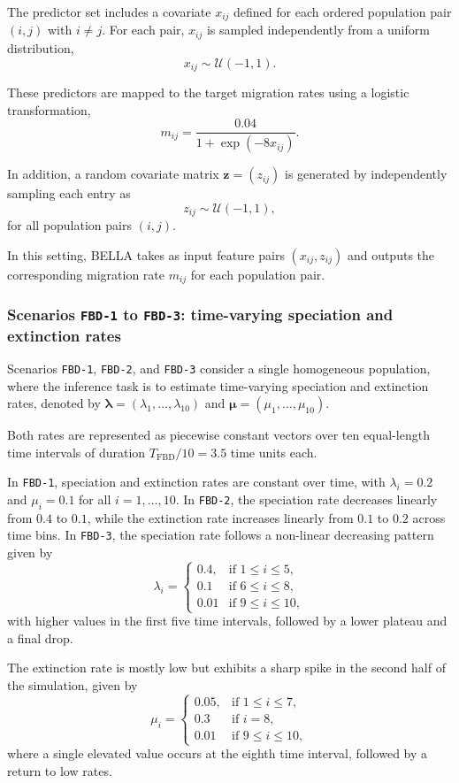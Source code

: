 The predictor set includes a covariate $x_{ij}$ defined for each ordered population pair $(i,j)$ with $i \neq j$. For each pair, $x_{ij}$ is sampled independently from a uniform distribution,
\[
x_{ij} \sim \mathcal{U}(-1,1).
\]

These predictors are mapped to the target migration rates using a logistic transformation,
\[
m_{ij} = \frac{0.04}{1 + \exp(- 8 x_{ij})}.
\]

In addition, a random covariate matrix $\mathbf{z} = (z_{ij})$ is generated by independently sampling each entry as
\[
z_{ij} \sim \mathcal{U}(-1,1),
\]
for all population pairs $(i,j)$.

In this setting, BELLA takes as input feature pairs $(x_{ij}, z_{ij})$ and outputs the corresponding migration rate $m_{ij}$ for each population pair.

\subsubsection{Scenarios \texttt{FBD-1} to \texttt{FBD-3}: time-varying speciation and extinction rates}

Scenarios \texttt{FBD-1}, \texttt{FBD-2}, and \texttt{FBD-3} consider a single homogeneous population, where the inference task is to estimate time-varying speciation and extinction rates, denoted by $\boldsymbol{\lambda} = (\lambda_1, \dots, \lambda_{10})$ and $\boldsymbol{\mu} = (\mu_1, \dots, \mu_{10})$.

Both rates are represented as piecewise constant vectors over ten equal-length time intervals of duration $T_{\text{FBD}} / 10 = 3.5$ time units each.

In \texttt{FBD-1}, speciation and extinction rates are constant over time, with $\lambda_i = 0.2$ and $\mu_i = 0.1$ for all $i = 1, \dots, 10$. In \texttt{FBD-2}, the speciation rate decreases linearly from $0.4$ to $0.1$, while the extinction rate increases linearly from $0.1$ to $0.2$ across time bins. In \texttt{FBD-3}, the speciation rate follows a non-linear decreasing pattern given by
\[
\lambda_i = 
\begin{cases}
0.4, & \text{if } 1 \le i \le 5, \\
0.1 & \text{if } 6 \le i \le 8, \\ 
0.01 & \text{if } 9 \le i \le 10,
\end{cases}
\]
with higher values in the first five time intervals, followed by a lower plateau and a final drop.

The extinction rate is mostly low but exhibits a sharp spike in the second half of the simulation, given by
\[
\mu_i = 
\begin{cases}
0.05, & \text{if } 1 \le i \le 7, \\
0.3 & \text{if } i = 8, \\ 
0.01 & \text{if } 9 \le i \le 10,
\end{cases}
\]
where a single elevated value occurs at the eighth time interval, followed by a return to low rates.

